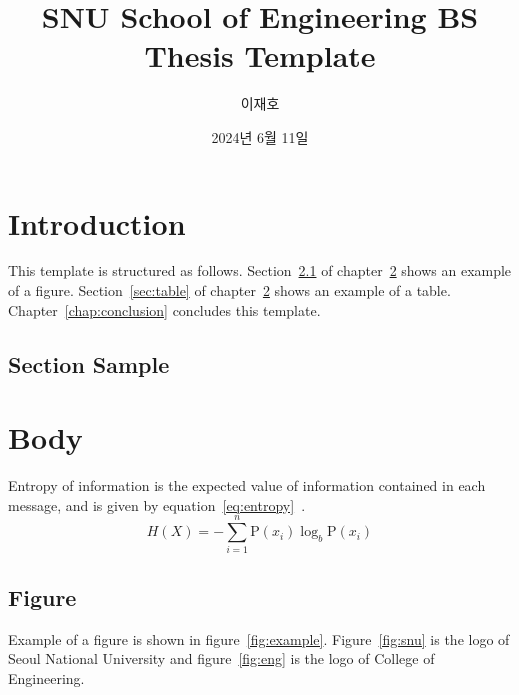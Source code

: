 \documentclass[en]{snu-cse-bsc-thesis}
\title{SNU School of Engineering BS Thesis Template}
\author{이재호}
\date{2024년 6월 11일}
\begin{document}
\maketitle

\begin{abstract}
  \lipsum[1]
\end{abstract}

\tableofcontents
\listoftables
\listoffigures

\chapter{Introduction}\label{chap:introduction}
This template is structured as follows.
Section~\ref{sec:figure} of chapter~\ref{chap:body} shows an example of a figure.
Section~\ref{sec:table} of chapter~\ref{chap:body} shows an example of a table.
Chapter~\ref{chap:conclusion} concludes this template.

\section{Section Sample}\label{sec:section}
\lipsum[2-3]


\chapter{Body}\label{chap:body}
Entropy of information is the expected value of information contained in each message, and is given by equation~\eqref{eq:entropy}~\cite{6773024}.
\begin{equation}\label{eq:entropy}
  H(X) = -\sum_{i=1}^n {\mathrm{P}(x_i) \log_b \mathrm{P}(x_i)}
\end{equation}

\lipsum[4-6]


\section{Figure}\label{sec:figure}
Example of a figure is shown in figure~\ref{fig:example}.
Figure~\ref{fig:snu} is the logo of Seoul National University and figure~\ref{fig:eng} is the logo of College of Engineering.
\end{document}
